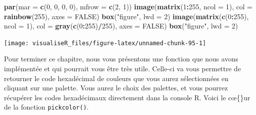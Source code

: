 \documentclass[]{article}
\newenvironment{Shaded}{\begin{snugshade}}{\end{snugshade}}
\newcommand{\DataTypeTok}[1]{\textcolor[rgb]{0.13,0.29,0.53}{#1}}
\newcommand{\DecValTok}[1]{\textcolor[rgb]{0.00,0.00,0.81}{#1}}
\newcommand{\KeywordTok}[1]{\textcolor[rgb]{0.13,0.29,0.53}{\textbf{#1}}}
\newcommand{\NormalTok}[1]{#1}
\newcommand{\OperatorTok}[1]{\textcolor[rgb]{0.81,0.36,0.00}{\textbf{#1}}}
\newcommand{\OtherTok}[1]{\textcolor[rgb]{0.56,0.35,0.01}{#1}}
\newcommand{\StringTok}[1]{\textcolor[rgb]{0.31,0.60,0.02}{#1}}
\begin{document}
\begin{Shaded}
\begin{Highlighting}[]
\KeywordTok{par}\NormalTok{(}\DataTypeTok{mar =} \KeywordTok{c}\NormalTok{(}\DecValTok{0}\NormalTok{, }\DecValTok{0}\NormalTok{, }\DecValTok{0}\NormalTok{, }\DecValTok{0}\NormalTok{), }\DataTypeTok{mfrow =} \KeywordTok{c}\NormalTok{(}\DecValTok{2}\NormalTok{, }\DecValTok{1}\NormalTok{))}
\KeywordTok{image}\NormalTok{(}\KeywordTok{matrix}\NormalTok{(}\DecValTok{1}\OperatorTok{:}\DecValTok{255}\NormalTok{, }\DataTypeTok{ncol =} \DecValTok{1}\NormalTok{), }\DataTypeTok{col =} \KeywordTok{rainbow}\NormalTok{(}\DecValTok{255}\NormalTok{), }\DataTypeTok{axes =} \OtherTok{FALSE}\NormalTok{)}
\KeywordTok{box}\NormalTok{(}\StringTok{"figure"}\NormalTok{, }\DataTypeTok{lwd =} \DecValTok{2}\NormalTok{)}
\KeywordTok{image}\NormalTok{(}\KeywordTok{matrix}\NormalTok{(}\KeywordTok{c}\NormalTok{(}\DecValTok{0}\OperatorTok{:}\DecValTok{255}\NormalTok{), }\DataTypeTok{ncol =} \DecValTok{1}\NormalTok{), }\DataTypeTok{col =} \KeywordTok{gray}\NormalTok{(}\KeywordTok{c}\NormalTok{(}\DecValTok{0}\OperatorTok{:}\DecValTok{255}\NormalTok{)}\OperatorTok{/}\DecValTok{255}\NormalTok{), }\DataTypeTok{axes =} \OtherTok{FALSE}\NormalTok{)}
\KeywordTok{box}\NormalTok{(}\StringTok{"figure"}\NormalTok{, }\DataTypeTok{lwd =} \DecValTok{2}\NormalTok{)}
\end{Highlighting}
\end{Shaded}

\begin{center}\texttt{[image: visualiseR\_files/figure-latex/unnamed-chunk-95-1]} \end{center}

Pour terminer ce chapitre, nous vous présentons une fonction que nous avons implémentée et qui pourrait vous être très utile. Celle-ci va vous permettre de retourner le code hexadécimal de couleurs que vous aurez sélectionnées en cliquant sur une palette. Vous aurez le choix des palettes, et vous pourrez récupérer les codes hexadécimaux directement dans la console R.
Voici le c\oe\{\}ur de la fonction \texttt{pickcolor()}.
\end{document}
